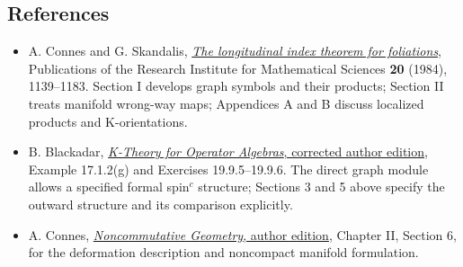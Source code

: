 \documentclass[
  11pt,
]{article}
\providecommand{\tightlist}{%
  \setlength{\itemsep}{0pt}\setlength{\parskip}{0pt}}
\begin{document}
\subsection{References}\label{references}

\begin{itemize}
\tightlist
\item
  A. Connes and G. Skandalis,
  \href{https://ems.press/content/serial-article-files/42241}{\emph{The
  longitudinal index theorem for foliations}}, Publications of the
  Research Institute for Mathematical Sciences \textbf{20} (1984),
  1139--1183. Section I develops graph symbols and their products;
  Section II treats manifold wrong-way maps; Appendices A and B discuss
  localized products and K-orientations.
\item
  B. Blackadar,
  \href{https://www.bruceblackadar.com/Mathematics/book6.pdf}{\emph{K-Theory
  for Operator Algebras}, corrected author edition}, Example 17.1.2(g)
  and Exercises 19.9.5--19.9.6. The direct graph module allows a
  specified formal spin\(^{c}\) structure; Sections 3 and 5 above
  specify the outward structure and its comparison explicitly.
\item
  A. Connes,
  \href{https://alainconnes.org/wp-content/uploads/book94bigpdf.pdf}{\emph{Noncommutative
  Geometry}, author edition}, Chapter II, Section 6, for the deformation
  description and noncompact manifold formulation.
\end{itemize}
\end{document}
